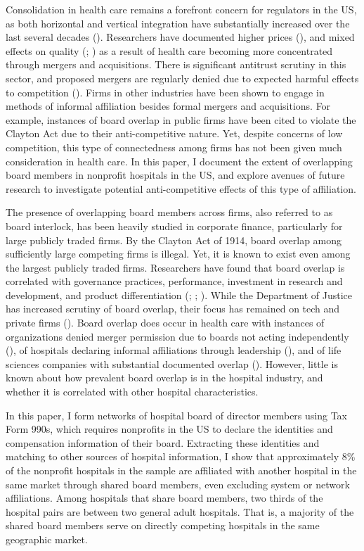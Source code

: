 \documentclass[12pt]{article}
\begin{document}
    Consolidation in health care remains a forefront concern for regulators in the US, as both horizontal and vertical integration have substantially increased over the last several decades (\cite{levinson2024ten}). Researchers have documented higher prices (\cite{brot2024pays}), and mixed effects on quality (\cite{kessler2000hospital}; \cite{cooper2011does}) as a result of health care becoming more concentrated through mergers and acquisitions. There is significant antitrust scrutiny in this sector, and proposed mergers are regularly denied due to expected harmful effects to competition (\cite{Meyer2022}). Firms in other industries have been shown to engage in methods of informal affiliation besides formal mergers and acquisitions. For example, instances of board overlap in public firms have been cited to violate the Clayton Act due to their anti-competitive nature. Yet, despite concerns of low competition, this type of connectedness among firms has not been given much consideration in health care. In this paper, I document the extent of overlapping board members in nonprofit hospitals in the US, and explore avenues of future research to investigate 
    potential anti-competitive effects of this type of affiliation.

    The presence of overlapping board members across firms, also referred to as board interlock, has been heavily studied in corporate finance, particularly for large publicly traded firms. By the Clayton Act of 1914, board overlap among sufficiently large competing firms is illegal. Yet, it is known to exist even among the largest publicly traded firms. Researchers have found that board overlap is correlated with governance practices, performance, investment in research and development, and product differentiation (\cite{cai2014board}; \cite{lamb2016ties}; \cite{geng2021does}). While the Department of Justice has increased scrutiny of board overlap, their focus has remained on tech and private firms (\cite{Morse2023}). Board overlap does occur in health care with instances of organizations denied merger permission due to boards not acting independently (\cite{huberfeld2006tackling}), of hospitals declaring informal affiliations through leadership (\cite{barnett_babcock_2012}), and of life sciences companies with substantial documented overlap (\cite{manjunath2024illegal}). However, little is known about how prevalent board overlap is in the hospital industry, and whether it is correlated with other hospital characteristics. 

    In this paper, I form networks of hospital board of director members using Tax Form 990s, which requires nonprofits in the US to declare the identities and compensation information of their board. Extracting these identities and matching to other sources of hospital information, I show that approximately 8\% of the nonprofit hospitals in the sample are affiliated with another hospital in the same market through shared board members, even excluding system or network affiliations. Among hospitals that share board members, two thirds of the hospital pairs are between two general adult hospitals. That is, a majority of the shared board members serve on directly competing hospitals in the same geographic market. 
\end{document}
